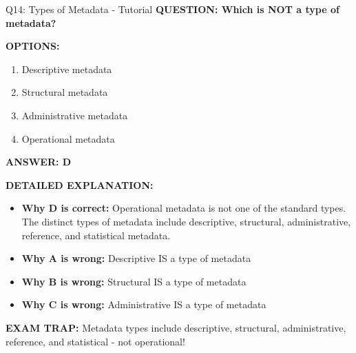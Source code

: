 \documentclass[8pt]{beamer}
\begin{document}
	\begin{frame}{Q14: Types of Metadata - Tutorial}
		\fontsize{6.5}{7.5}\selectfont
		\textbf{QUESTION: Which is NOT a type of metadata?}
		
		\vspace{0.1cm}
		\textbf{OPTIONS:}
		\begin{enumerate}
			\item Descriptive metadata
			\item Structural metadata
			\item Administrative metadata
			\item Operational metadata
		\end{enumerate}
		
		\vspace{0.1cm}
		\textcolor{myblue}{\textbf{ANSWER: D}}
		
		\vspace{0.1cm}
		\textbf{DETAILED EXPLANATION:}
		\begin{itemize}
			\item \textbf{Why D is correct:} Operational metadata is not one of the standard types. The distinct types of metadata include descriptive, structural, administrative, reference, and statistical metadata.
			\item \textbf{Why A is wrong:} Descriptive IS a type of metadata
			\item \textbf{Why B is wrong:} Structural IS a type of metadata
			\item \textbf{Why C is wrong:} Administrative IS a type of metadata
		\end{itemize}
		
		\textcolor{myred}{\textbf{EXAM TRAP:}} Metadata types include \textcolor{myblue}{descriptive, structural, administrative, reference, and statistical} - not operational!
	\end{frame}
	
\end{document}
